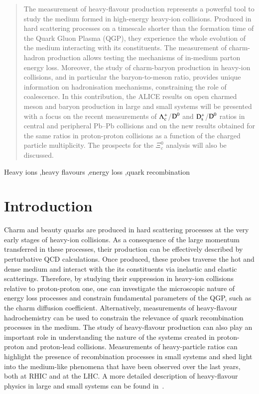 \documentclass[3p,times,procedia]{elsarticle}
\newcommand{\PbPb}{\mbox{Pb--Pb}}
\newcommand{\Dzero}{{\rm D^0}}
\newcommand{\Ds}{{\rm D_{s}^+}}
\newcommand{\Lc}{{\rm \Lambda_{c}^+}}
\begin{document}
\begin{frontmatter}
\begin{abstract}
The measurement of heavy-flavour production represents a powerful tool to study the medium formed in high-energy 
heavy-ion collisions. Produced in hard scattering processes on a timescale shorter than the formation time of the Quark
Gluon Plasma (QGP), they experience the whole evolution of the medium interacting with its constituents. The measurement 
of charm-hadron production allows testing the mechanisms of in-medium parton energy loss. Moreover, the study of charm-baryon 
production in heavy-ion collisions, and in particular the baryon-to-meson ratio, provides unique information on 
hadronisation mechanisms, constraining the role of coalescence.
In this contribution, the ALICE results on open charmed meson and baryon production in large and small systems will be presented
with a focus on the recent measurements of $\Lc$/$\Dzero$ and $\Ds$/$\Dzero$ ratios in central and peripheral $\PbPb$ collisions 
and on the new results obtained for the same ratios in proton-proton collisions as a function of the charged particle multiplicity.
The prospects for the $\Xi^{0}_{c}$ analysis will also be discussed.
\end{abstract}

\begin{keyword}
Heavy ions \sep heavy flavours \sep energy loss \sep quark recombination
\end{keyword}
\end{frontmatter}


\section{Introduction}
\label{intro}
Charm and beauty quarks are produced in hard scattering processes at the very early stages of heavy-ion collisions. As a consequence of the 
large momentum transferred in these processes, their production can be effectively described by perturbative QCD calculations. 
Once produced, these probes traverse the hot and dense medium and interact with the its constituents via inelastic and elastic scatterings.
Therefore, by studying their suppression in heavy-ion collisions relative to proton-proton one, one can investigate the microscopic nature of energy loss processes
and constrain fundamental parameters of the QGP, such as the charm diffusion coefficient. Alternatively, measurements of 
heavy-flavour hadrochemistry can be used to constrain the relevance of quark recombination processes in the medium.
The study of heavy-flavour production can also play an important role in understanding the nature of the systems created in proton-proton and 
proton-lead collisions. Measurements of heavy-particle ratios can highlight the presence of recombination 
processes in small systems and shed light into the medium-like phenomena that have been observed over the last years, both at RHIC and at the LHC. 
A more detailed description of heavy-flavour physics in large and small systems can be found in~\cite{saporegravis,prinorapp,yenjie}.
\end{document}

